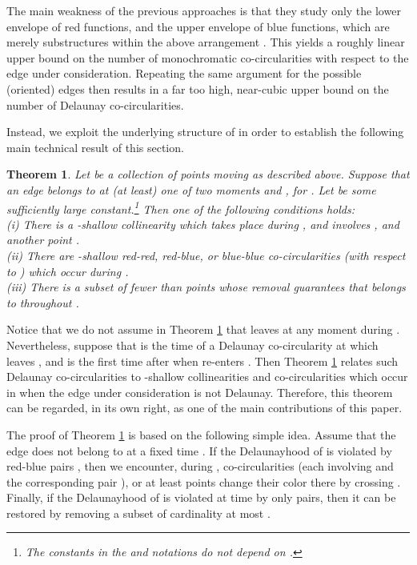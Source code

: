 \documentclass[letter,11pt]{article}
\newtheorem{theorem}{Theorem}[section]
\begin{document}
The main weakness of the previous approaches \cite{FuLee,gmr-vdmpp-92} is that they study only the lower envelope  of red functions, and the upper envelope  of blue functions, which are merely substructures within the above arrangement .
This yields a roughly linear upper bound on the number of monochromatic co-circularities with respect to the edge  under consideration.
Repeating the same argument for the  possible (oriented) edges  then results in a far too high, near-cubic upper bound on the number of Delaunay co-circularities.

Instead, we exploit the underlying structure of  in order to establish the following
main technical result of this section.

\begin{theorem}\label{Thm:RedBlue}
Let  be a collection of  points moving as described above. Suppose that an edge  belongs to  at (at least) one of two moments  and , for .
Let  be some sufficiently large constant.\footnote{The constants in the  and  notations do not depend on .}
Then one of the following conditions holds:\\
\indent (i) There is a -shallow collinearity which takes place during , and involves ,  and another point .\\
\indent (ii) There are  -shallow red-red, red-blue, or blue-blue co-circularities (with respect to ) which occur during .\\
\indent (iii) There is a subset  of fewer than  points whose removal guarantees that  belongs to  throughout .
\end{theorem}

Notice that we do not assume in Theorem \ref{Thm:RedBlue} that  leaves  at any moment during . 
Nevertheless, suppose that  is the time of a Delaunay co-circularity at which  leaves , and  is the first time after  when  re-enters .
Then Theorem \ref{Thm:RedBlue} relates such Delaunay co-circularities to -shallow collinearities and co-circularities which occur in  when the edge  under consideration is not Delaunay.
Therefore, this theorem can be regarded, in its own right, as one of the main contributions of this paper.






The proof of Theorem \ref{Thm:RedBlue} is based on the following simple idea. Assume that the edge  does not belong to  at a fixed time . If the Delaunayhood of  is violated by  red-blue pairs , then we encounter, during ,  co-circularities (each involving  and the corresponding pair ), or at least  points  change their color there by crossing . 
Finally, if the Delaunayhood of  is violated at time  by only  pairs, then it can be restored by removing a subset  of cardinality at most . 
\end{document}
